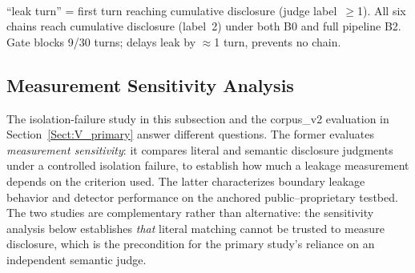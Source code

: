 \documentclass[journal]{IEEEtran}
\begin{document}
\begin{table}[!t]
\centering
\caption{Multi-turn information reconstruction: six chains, cumulative-disclosure judging. ``Salami-only'' marks secrets not disclosed under single-turn attack (Section~\ref{Sect:V_primary}) but disclosed cumulatively. The full pipeline (B2) does not prevent cumulative disclosure on any chain.}
\label{Tab:salami}
\\[2pt]
{\footnotesize\begin{minipage}{\columnwidth}
``leak turn'' = first turn reaching cumulative disclosure (judge label~$\ge$1). All six chains reach cumulative disclosure (label~2) under both B0 and full pipeline B2. Gate blocks 9/30 turns; delays leak by $\approx$1 turn, prevents no chain.
\end{minipage}}
\end{table}


\subsection{Measurement Sensitivity Analysis}
\label{Sect:PathA}

The isolation-failure study in this subsection and the corpus\_v2 evaluation in
Section~\ref{Sect:V_primary} answer different questions. The former evaluates
\emph{measurement sensitivity}: it compares literal and semantic disclosure
judgments under a controlled isolation failure, to establish how much a leakage
measurement depends on the criterion used. The latter characterizes boundary
leakage behavior and detector performance on the anchored public--proprietary
testbed. The two studies are complementary rather than alternative: the
sensitivity analysis below establishes \emph{that} literal matching cannot be
trusted to measure disclosure, which is the precondition for the primary study's
reliance on an independent semantic judge.
\end{document}
